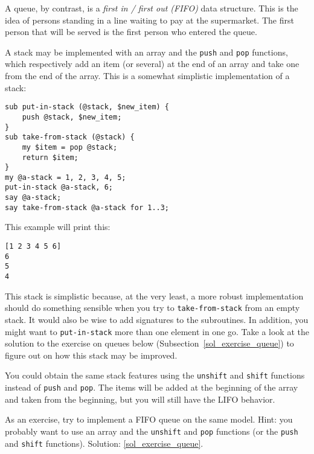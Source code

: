 A queue, by contrast, is a \emph{first in / first out (FIFO)} data 
structure. This is the idea of persons standing in a 
line waiting to pay at the supermarket. The first 
person that will be served is the first person who entered 
the queue.

A stack may be implemented with an array and the {\tt push} 
and {\tt pop} functions, which respectively add an item (or 
several) at the end of an array and take one from the end of 
the array. This is a somewhat simplistic implementation of 
a stack:
\label{stack_code}

\begin{verbatim}
sub put-in-stack (@stack, $new_item) {
    push @stack, $new_item;
}
sub take-from-stack (@stack) {
    my $item = pop @stack;
    return $item;
}
my @a-stack = 1, 2, 3, 4, 5;
put-in-stack @a-stack, 6;
say @a-stack;
say take-from-stack @a-stack for 1..3;
\end{verbatim}

This example will print this:

\begin{verbatim}
[1 2 3 4 5 6]
6
5
4
\end{verbatim}

This stack is simplistic because, at the very least, a more 
robust implementation should do something sensible when you 
try to {\tt take-from-stack} from an empty stack. It would 
also be wise to add signatures to the subroutines. In 
addition, you might want to {\tt put-in-stack} more than 
one element in one go. Take a look at the solution to the 
exercise on queues below (Subsection~\ref{sol_exercise_queue}) 
to figure out on how this stack may be improved.

You could obtain the same stack features using the  
{\tt unshift} and {\tt shift} functions instead of {\tt push} 
and {\tt pop}. The items will be added at the beginning of 
the array and taken from the beginning, but you will still 
have the LIFO behavior.

\label{exercise_queue}
As an exercise, try to implement a FIFO queue on the same model. 
Hint: you probably want to use an array and the {\tt unshift} 
and {\tt pop} functions (or the {\tt push} and {\tt shift} functions). Solution: \ref{sol_exercise_queue}.

